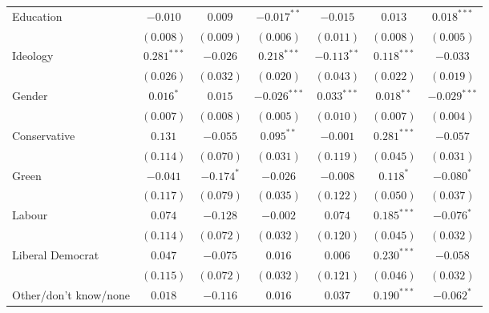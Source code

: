 \documentclass[12pt, letter]{article}
\begin{document}
\begin{table}
\begin{center}
{\begin{tabular}{l c c c c c c}
Education                        & $-0.010$       & $0.009$        & $-0.017^{**}$  & $-0.015$       & $0.013$        & $0.018^{***}$  \\
                                 & $(0.008)$      & $(0.009)$      & $(0.006)$      & $(0.011)$      & $(0.008)$      & $(0.005)$      \\
Ideology                         & $0.281^{***}$  & $-0.026$       & $0.218^{***}$  & $-0.113^{**}$  & $0.118^{***}$  & $-0.033$       \\
                                 & $(0.026)$      & $(0.032)$      & $(0.020)$      & $(0.043)$      & $(0.022)$      & $(0.019)$      \\
Gender                           & $0.016^{*}$    & $0.015$        & $-0.026^{***}$ & $0.033^{***}$  & $0.018^{**}$   & $-0.029^{***}$ \\
                                 & $(0.007)$      & $(0.008)$      & $(0.005)$      & $(0.010)$      & $(0.007)$      & $(0.004)$      \\
Conservative                     & $0.131$        & $-0.055$       & $0.095^{**}$   & $-0.001$       & $0.281^{***}$  & $-0.057$       \\
                                 & $(0.114)$      & $(0.070)$      & $(0.031)$      & $(0.119)$      & $(0.045)$      & $(0.031)$      \\
Green                            & $-0.041$       & $-0.174^{*}$   & $-0.026$       & $-0.008$       & $0.118^{*}$    & $-0.080^{*}$   \\
                                 & $(0.117)$      & $(0.079)$      & $(0.035)$      & $(0.122)$      & $(0.050)$      & $(0.037)$      \\
Labour                           & $0.074$        & $-0.128$       & $-0.002$       & $0.074$        & $0.185^{***}$  & $-0.076^{*}$   \\
                                 & $(0.114)$      & $(0.072)$      & $(0.032)$      & $(0.120)$      & $(0.045)$      & $(0.032)$      \\
Liberal Democrat                 & $0.047$        & $-0.075$       & $0.016$        & $0.006$        & $0.230^{***}$  & $-0.058$       \\
                                 & $(0.115)$      & $(0.072)$      & $(0.032)$      & $(0.121)$      & $(0.046)$      & $(0.032)$      \\
Other/don't know/none            & $0.018$        & $-0.116$       & $0.016$        & $0.037$        & $0.190^{***}$  & $-0.062^{*}$   \\

\end{tabular}}
\end{center}
\end{table}
\end{document}
